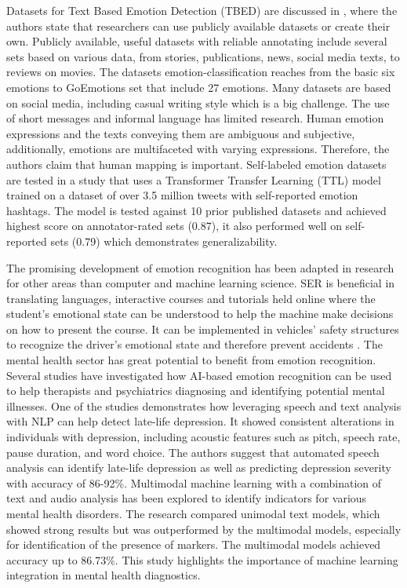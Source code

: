 Datasets for Text Based Emotion Detection (TBED) are discussed in \autocite{Kusal2023}, where the authors state that researchers can use publicly available datasets or create their own. Publicly available, useful datasets with reliable annotating include several sets based on various data, from stories, publications, news, social media texts, to reviews on movies. The datasets emotion-classification reaches from the basic six emotions to GoEmotions set that include 27 emotions. Many datasets are based on social media, including casual writing style which is a big challenge. The use of short messages and informal language has limited research. Human emotion expressions and the texts conveying them are ambiguous and subjective, additionally, emotions are multifaceted with varying expressions. Therefore, the authors claim that human mapping is important. 
Self-labeled emotion datasets are tested in a study \autocite{Lee2023} that uses a Transformer Transfer Learning (TTL) model trained on a dataset of over 3.5 million tweets with self-reported emotion hashtags. The model is tested against 10 prior published datasets and achieved highest score on annotator-rated sets (0.87), it also performed well on self-reported sets (0.79) which demonstrates generalizability.  

The promising development of emotion recognition has been adapted in research for other areas than computer and machine learning science. SER is beneficial in translating languages, interactive courses and tutorials held online where the student’s emotional state can be understood to help the machine make decisions on how to present the course. It can be implemented in vehicles’ safety structures to recognize the driver’s emotional state and therefore prevent accidents \autocite{Abbaschian2021}. The mental health sector has great potential to benefit from emotion recognition. Several studies \autocite{DeSouza2021, Drougkas2024, Simcock2020,Singh2023} have investigated how AI-based emotion recognition can be used to help therapists and psychiatrics diagnosing and identifying potential mental illnesses. One of the studies \autocite{DeSouza2021} demonstrates how leveraging speech and text analysis with NLP can help detect late-life depression. It showed consistent alterations in individuals with depression, including acoustic features such as pitch, speech rate, pause duration, and word choice. The authors suggest that automated speech analysis can identify late-life depression as well as predicting depression severity with accuracy of 86-92\%. Multimodal machine learning with a combination of text and audio analysis has been explored to identify indicators for various mental health disorders. The research \autocite{Drougkas2024} compared unimodal text models, which showed strong results but was outperformed by the multimodal models, especially for identification of the presence of markers. The multimodal models achieved accuracy up to 86.73\%. This study highlights the importance of machine learning integration in mental health diagnostics. 

